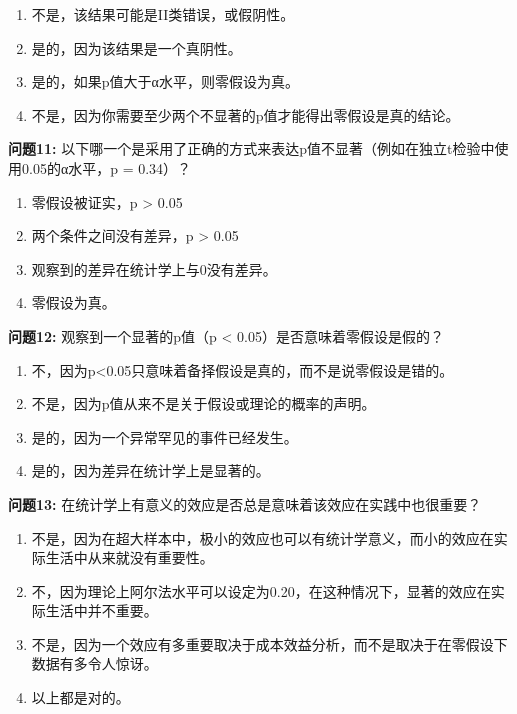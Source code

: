 \documentclass[
  letterpaper,
  DIV=11,
  numbers=noendperiod]{scrreprt}
\providecommand{\tightlist}{%
  \setlength{\itemsep}{0pt}\setlength{\parskip}{0pt}}\usepackage{longtable,booktabs,array}
\begin{document}
\begin{enumerate}
\def\labelenumi{\Alph{enumi})}
\tightlist
\item
  不是，该结果可能是II类错误，或假阴性。
\item
  是的，因为该结果是一个真阴性。
\item
  是的，如果p值大于α水平，则零假设为真。
\item
  不是，因为你需要至少两个不显著的p值才能得出零假设是真的结论。
\end{enumerate}

\textbf{问题11:}
以下哪一个是采用了正确的方式来表达p值不显著（例如在独立t检验中使用0.05的α水平，p
= 0.34）？

\begin{enumerate}
\def\labelenumi{\Alph{enumi})}
\tightlist
\item
  零假设被证实，p \textgreater{} 0.05
\item
  两个条件之间没有差异，p \textgreater{} 0.05
\item
  观察到的差异在统计学上与0没有差异。
\item
  零假设为真。
\end{enumerate}

\textbf{问题12:} 观察到一个显著的p值（p \textless{}
0.05）是否意味着零假设是假的？

\begin{enumerate}
\def\labelenumi{\Alph{enumi})}
\tightlist
\item
  不，因为p\textless0.05只意味着备择假设是真的，而不是说零假设是错的。
\item
  不是，因为p值从来不是关于假设或理论的概率的声明。
\item
  是的，因为一个异常罕见的事件已经发生。
\item
  是的，因为差异在统计学上是显著的。
\end{enumerate}

\textbf{问题13:}
在统计学上有意义的效应是否总是意味着该效应在实践中也很重要？

\begin{enumerate}
\def\labelenumi{\Alph{enumi})}
\tightlist
\item
  不是，因为在超大样本中，极小的效应也可以有统计学意义，而小的效应在实际生活中从来就没有重要性。
\item
  不，因为理论上阿尔法水平可以设定为0.20，在这种情况下，显著的效应在实际生活中并不重要。
\item
  不是，因为一个效应有多重要取决于成本效益分析，而不是取决于在零假设下数据有多令人惊讶。
\item
  以上都是对的。
\end{enumerate}
\end{document}
